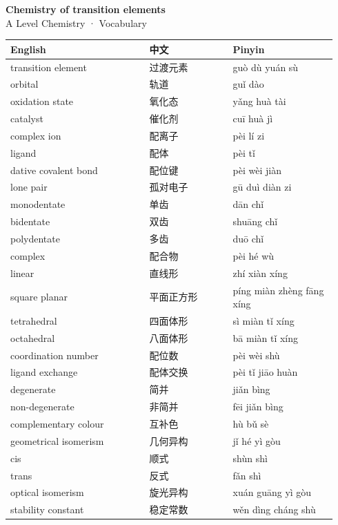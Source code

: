 \documentclass[11pt]{article}
\begin{document}
\begin{center}
  {\LARGE\bfseries Chemistry of transition elements}\\[0.35em]
  {\large A Level Chemistry · Vocabulary}
\end{center}
\vspace{0.6em}

\begin{longtable}{@{}p{0.40\linewidth}p{0.24\linewidth}p{0.30\linewidth}@{}}
\toprule
\textbf{English} & \textbf{中文} & \textbf{Pinyin} \\
\midrule
\endhead
\bottomrule
\endlastfoot
transition element & 过渡元素 & guò dù yuán sù \\
orbital & 轨道 & guǐ dào \\
oxidation state & 氧化态 & yǎng huà tài \\
catalyst & 催化剂 & cuī huà jì \\
complex ion & 配离子 & pèi lí zi \\
ligand & 配体 & pèi tǐ \\
dative covalent bond & 配位键 & pèi wèi jiàn \\
lone pair & 孤对电子 & gū duì diàn zi \\
monodentate & 单齿 & dān chǐ \\
bidentate & 双齿 & shuāng chǐ \\
polydentate & 多齿 & duō chǐ \\
complex & 配合物 & pèi hé wù \\
linear & 直线形 & zhí xiàn xíng \\
square planar & 平面正方形 & píng miàn zhèng fāng xíng \\
tetrahedral & 四面体形 & sì miàn tǐ xíng \\
octahedral & 八面体形 & bā miàn tǐ xíng \\
coordination number & 配位数 & pèi wèi shù \\
ligand exchange & 配体交换 & pèi tǐ jiāo huàn \\
degenerate & 简并 & jiǎn bìng \\
non-degenerate & 非简并 & fēi jiǎn bìng \\
complementary colour & 互补色 & hù bǔ sè \\
geometrical isomerism & 几何异构 & jǐ hé yì gòu \\
cis & 顺式 & shùn shì \\
trans & 反式 & fǎn shì \\
optical isomerism & 旋光异构 & xuán guāng yì gòu \\
stability constant & 稳定常数 & wěn dìng cháng shù \\
\end{longtable}
\end{document}
